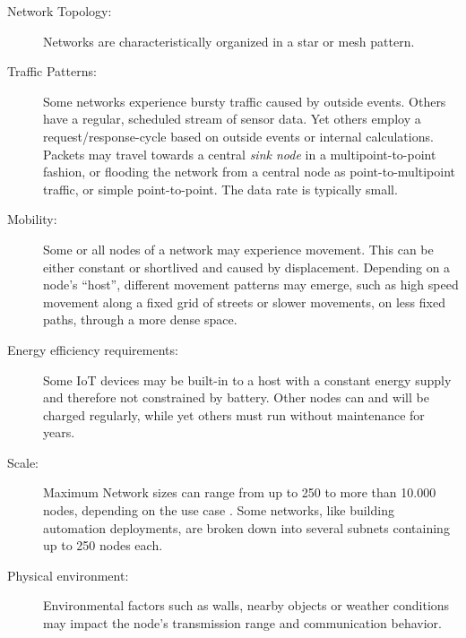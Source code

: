 \documentclass{acm_proc_article-sp}
\begin{document}
\begin{description}
\item[Network Topology:] Networks are characteristically organized in a star or mesh pattern.
\item[Traffic Patterns:] Some networks experience bursty traffic caused by outside events. Others have a regular, scheduled stream of sensor data. Yet others employ a request/response-cycle based on outside events or internal calculations. Packets may travel towards a central \emph{sink node} in a multipoint-to-point fashion, or flooding the network from a central node as point-to-multipoint traffic, or simple point-to-point. The data rate is typically small.
\item[Mobility:] Some or all nodes of a network may experience movement. This can be either constant or shortlived and caused by displacement. Depending on a node's ``host'', different movement patterns may emerge, such as high speed movement along a fixed grid of streets or slower movements, on less fixed paths, through a more dense space.
\item[Energy efficiency requirements:] Some IoT devices may be built-in to a host with a constant energy supply and therefore not constrained by battery. Other nodes can and will be charged regularly, while yet others must run without maintenance for years.
\item[Scale:] Maximum Network sizes can range from up to 250 to more than 10.000 nodes, depending on the use case \cite{RFC-5826} \cite{RFC-5867} \cite{RFC-5548}. Some networks, like building automation deployments, are broken down into several subnets containing up to 250 nodes each.
\item[Physical environment:] Environmental factors such as walls, nearby objects or weather conditions may impact the node's transmission range \cite{food_monitoring} and communication behavior.
\end{description}
\end{document}
